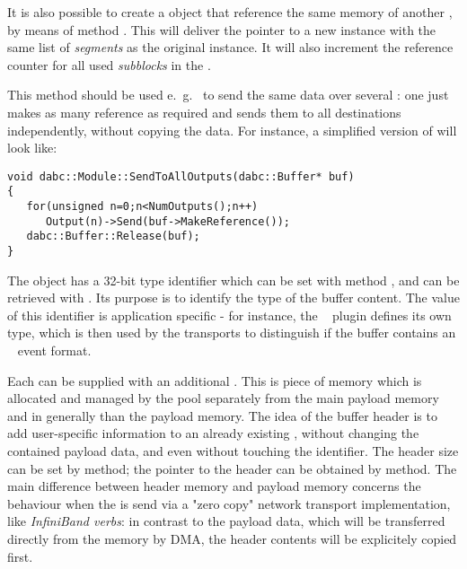 It is also possible to create a  object that reference 
the same memory of another , by means of method
.
This will deliver the pointer to a new
 instance with the same list of {\em segments}
as the original instance. It will also
increment the reference counter for all used  
{\em subblocks} in the . 

This method should be used e.~g.~ to send
the same data over several : 
one just makes as many reference   
as required and sends them to all destinations independently,
without copying the data.
For instance, a simplified version of 
 will look like:  

\begin{small}
\begin{verbatim}     
void dabc::Module::SendToAllOutputs(dabc::Buffer* buf)
{
   for(unsigned n=0;n<NumOutputs();n++)
      Output(n)->Send(buf->MakeReference());
   dabc::Buffer::Release(buf);
}
\end{verbatim}     
\end{small}


The  object has a 32-bit type identifier which can be set with
method , and can be retrieved with .
Its purpose is to identify the type of the buffer content. The value of   
this identifier is application specific - for instance, 
the \mbs~ plugin defines its own type,
which is then used by the transports to distinguish if the buffer 
contains an \mbs~ event format.  

Each  can be supplied with an additional . 
This is piece of 
memory which is allocated and managed by the pool separately from the main  
payload memory and in generally  than the payload memory. 
The idea of the buffer header is to add user-specific
information to an already existing ,
without changing the contained payload data, and
even without touching the  identifier. 
The header size can be set by  method;
the pointer to the header can be
obtained by  method.
The main difference between header memory and payload memory 
concerns the behaviour when the  is send via 
a "zero copy" network transport implementation, like {\em InfiniBand verbs}:
in contrast to the payload data, which will be
transferred directly from the  memory by DMA, 
the header contents will be explicitely copied first.


